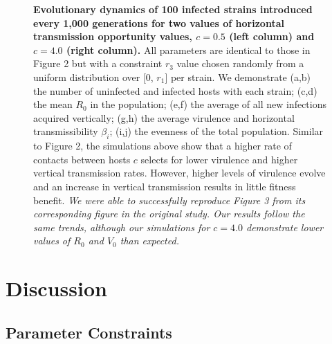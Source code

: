 \begin{figure}[tbp]
    \medskip
    \hfil
\caption{\textbf{Evolutionary dynamics of 100 infected strains introduced every 1,000 generations for two values of horizontal transmission opportunity values, $c = 0.5$ (left column) and $c = 4.0$ (right column).} All parameters are identical to those in Figure 2 but with a constraint $r_3$ value chosen randomly from a uniform distribution over [0, $r_1$] per strain. We demonstrate (a,b) the number of uninfected and infected hosts with each strain; (c,d) the mean $R_0$ in the population; (e,f) the average of all new infections acquired vertically; (g,h) the average virulence and horizontal transmissibility $\beta_i$; (i,j) the evenness of the total population. Similar to Figure 2, the simulations above show that a higher rate of contacts between hosts $c$ selects for lower virulence and higher vertical transmission rates. However, higher levels of virulence evolve and an increase in vertical transmission results in little fitness benefit. \textit{We were able to successfully reproduce Figure 3 from its corresponding figure in the original study. Our results follow the same trends, although our simulations for $c = 4.0$ demonstrate lower values of $R_0$ and $V_0$ than expected.}
}
    \label{fig:figure3}
\end{figure}

\section{Discussion}
\subsection{Parameter Constraints}

